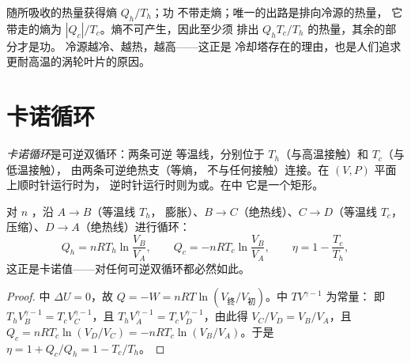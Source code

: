 \begin{remark}[效率为何不能等于~1]\label{rem:b1:heat-engines:why}
随所吸收的热量获得熵 $Q_h/T_h$；功
不带走熵；唯一的出路是排向冷源的热量，
它带走的熵为 $|Q_c|/T_c$。熵不可产生，因此至少须
排出 $Q_h T_c/T_h$ 的热量，其余的部分才是功。
冷源越冷、越热，越高——这正是
冷却塔存在的理由，也是人们追求更耐高温的涡轮叶片的原因。
\end{remark}

\section{卡诺循环}

\begin{definition}[卡诺循环]\label{def:b1:heat-engines:carnotcycle}
\emph{卡诺循环}是可逆双循环：两条可逆
等温线，分别位于 $T_h$（与高温接触）和 $T_c$（与低温接触），
由两条可逆绝热支（等熵，
不与任何接触）连接。在 $(V, P)$ 平面上顺时针运行时为，
逆时针运行时则为或。在中
它是一个矩形。
\end{definition}

\begin{proposition}[理想气体的卡诺循环]\label{prop:b1:heat-engines:carnotgas}
对 $n$ ，沿 $A \to B$（等温线 $T_h$，
膨胀）、$B \to C$（绝热线）、$C \to D$（等温线 $T_c$，
压缩）、$D \to A$（绝热线）进行循环：
\[
Q_h = nRT_h\ln\frac{V_B}{V_A}, \qquad
Q_c = -nRT_c\ln\frac{V_B}{V_A}, \qquad
\eta = 1 - \frac{T_c}{T_h} ,
\]
这正是卡诺值——对任何可逆双循环都必然如此。
\end{proposition}

\begin{proof}
中 $\Delta U = 0$，故 $Q = -W = nRT\ln(V_{\text{终}}/
V_{\text{初}})$。中 $TV^{\gamma-1}$ 为常量：
即 $T_hV_B^{\gamma-1} = T_cV_C^{\gamma-1}$，且 $T_hV_A^{\gamma-1} =
T_cV_D^{\gamma-1}$，由此得 $V_C/V_D = V_B/V_A$，且 $Q_c = nRT_c\ln(V_D/V_C) =
-nRT_c\ln(V_B/V_A)$。于是 $\eta = 1 + Q_c/Q_h = 1 - T_c/T_h$。
\end{proof}

